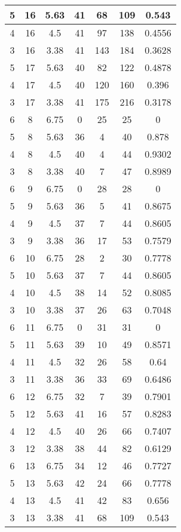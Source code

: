 \documentclass[letterpaper, 12pt]{article}
\begin{document}
\begin{longtable}{|c|c|c|c|c|c|c|}
\hline
5 & 16 & 5.63 & 41 & 68 & 109 & 0.543 \\
\hline
4 & 16 & 4.5 & 41 & 97 & 138 & 0.4556 \\
\hline
3 & 16 & 3.38 & 41 & 143 & 184 & 0.3628 \\
\hline
5 & 17 & 5.63 & 40 & 82 & 122 & 0.4878 \\
\hline
4 & 17 & 4.5 & 40 & 120 & 160 & 0.396 \\
\hline
3 & 17 & 3.38 & 41 & 175 & 216 & 0.3178 \\
\hline
6 & 8 & 6.75 & 0 & 25 & 25 & 0 \\
\hline
5 & 8 & 5.63 & 36 & 4 & 40 & 0.878 \\
\hline
4 & 8 & 4.5 & 40 & 4 & 44 & 0.9302 \\
\hline
3 & 8 & 3.38 & 40 & 7 & 47 & 0.8989 \\
\hline
6 & 9 & 6.75 & 0 & 28 & 28 & 0 \\
\hline
5 & 9 & 5.63 & 36 & 5 & 41 & 0.8675 \\
\hline
4 & 9 & 4.5 & 37 & 7 & 44 & 0.8605 \\
\hline
3 & 9 & 3.38 & 36 & 17 & 53 & 0.7579 \\
\hline
6 & 10 & 6.75 & 28 & 2 & 30 & 0.7778 \\
\hline
5 & 10 & 5.63 & 37 & 7 & 44 & 0.8605 \\
\hline
4 & 10 & 4.5 & 38 & 14 & 52 & 0.8085 \\
\hline
3 & 10 & 3.38 & 37 & 26 & 63 & 0.7048 \\
\hline
6 & 11 & 6.75 & 0 & 31 & 31 & 0 \\
\hline
5 & 11 & 5.63 & 39 & 10 & 49 & 0.8571 \\
\hline
4 & 11 & 4.5 & 32 & 26 & 58 & 0.64 \\
\hline
3 & 11 & 3.38 & 36 & 33 & 69 & 0.6486 \\
\hline
6 & 12 & 6.75 & 32 & 7 & 39 & 0.7901 \\
\hline
5 & 12 & 5.63 & 41 & 16 & 57 & 0.8283 \\
\hline
4 & 12 & 4.5 & 40 & 26 & 66 & 0.7407 \\
\hline
3 & 12 & 3.38 & 38 & 44 & 82 & 0.6129 \\
\hline
6 & 13 & 6.75 & 34 & 12 & 46 & 0.7727 \\
\hline
5 & 13 & 5.63 & 42 & 24 & 66 & 0.7778 \\
\hline
4 & 13 & 4.5 & 41 & 42 & 83 & 0.656 \\
\hline
3 & 13 & 3.38 & 41 & 68 & 109 & 0.543 \\

\end{longtable}
\end{document}
